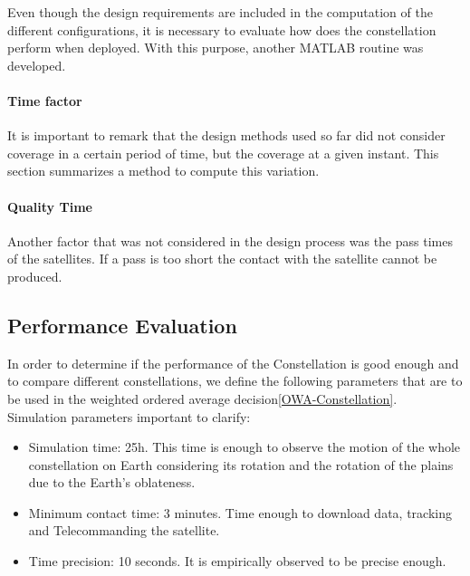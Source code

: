 \label{ch:PerformanceAnal}
Even though the design requirements are included in the computation of the different configurations, it is necessary to evaluate how does the constellation perform when deployed. With this purpose, another MATLAB routine was developed. 

\paragraph{Time factor\\}
It is important to remark that the design methods used so far did not consider coverage in a certain period of time, but the coverage at a given instant. This section summarizes a method to compute this variation.

\paragraph{Quality Time\\}
Another factor that was not considered in the design process was the pass times of the satellites. If a pass is too short the contact with the satellite cannot be produced. 

\subsection{Performance Evaluation}
In order to determine if the performance of the Constellation is good enough and to compare different constellations, we define the following parameters that are to be used in the weighted ordered average decision\ref{OWA-Constellation}.\\
\newline
Simulation parameters important to clarify:
\begin{itemize}
\item Simulation time: 25h. This time is enough to observe the motion of the whole constellation on Earth considering its rotation and the rotation of the plains due to the Earth's oblateness.
\item Minimum contact time: 3 minutes. Time enough to download data, tracking and Telecommanding the satellite.
\item Time precision: 10 seconds. It is empirically observed to be precise enough.
\end{itemize}

